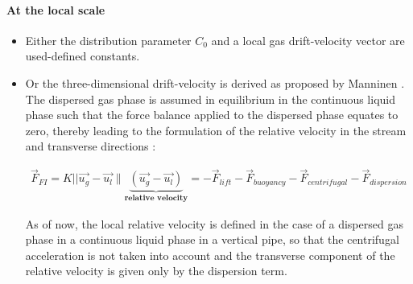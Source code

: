 \paragraph{At the local scale} 
\begin{itemize}
	\item Either the distribution parameter $C_0$ and a local gas drift-velocity vector are used-defined constants. 
	\item Or the three-dimensional drift-velocity is derived as proposed by Manninen \cite{manninen1996mixture}. The dispersed gas phase  is assumed in equilibrium in the continuous liquid phase such that the force balance applied to the dispersed phase equates to zero, thereby leading to the formulation of the relative velocity in the stream and transverse directions :
	
	\begin{align}
		\overrightarrow{F}_{FI} = K ||\overrightarrow{u_g} - \overrightarrow{u_l}\rVert \underbrace{(\overrightarrow{u_g} - \overrightarrow{u_l})}_\textbf{relative velocity}  = - \overrightarrow{F}_{lift} - \overrightarrow{F}_{buoyancy} -\overrightarrow{F}_{centrifugal} -\overrightarrow{F}_{dispersion}
	\end{align}	 

As of now, the local relative velocity is defined in the case of a dispersed gas phase in a continuous liquid phase in a vertical pipe, so that the centrifugal acceleration is not taken into account and the transverse component of the relative velocity is given only by the dispersion term.  

\end{itemize}


 


